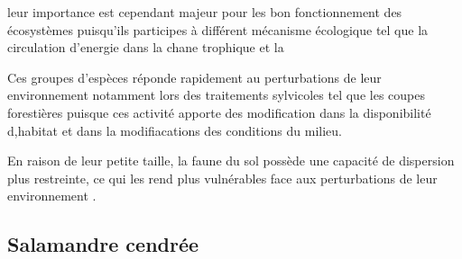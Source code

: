 leur importance est cependant majeur pour les bon fonctionnement des écosystèmes puisqu'ils participes à différent mécanisme écologique tel que la circulation d'energie dans la chane trophique et la 

Ces groupes d'espèces réponde rapidement au perturbations de leur environnement notamment lors des traitements sylvicoles tel que les coupes forestières puisque ces activité apporte des modification dans la disponibilité d,habitat et dans la modifiacations des conditions du milieu.

En raison de leur petite taille, la faune du sol possède une capacité de dispersion plus restreinte, ce qui les rend plus vulnérables face aux perturbations de leur environnement \citep{Kudrin2023metaanalysiseffects}.


\subsection*{Salamandre cendrée}

